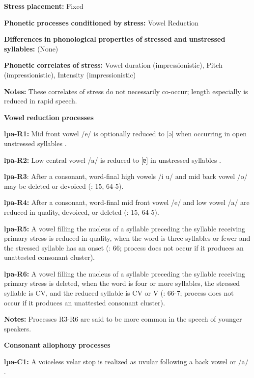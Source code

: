 \textbf{Stress} \textbf{placement:} Fixed

\textbf{Phonetic} \textbf{processes} \textbf{conditioned} \textbf{by} \textbf{stress:} Vowel Reduction

\textbf{Differences} \textbf{in} \textbf{phonological} \textbf{properties} \textbf{of} \textbf{stressed} \textbf{and} \textbf{unstressed} \textbf{syllables:} (None)

\textbf{Phonetic} \textbf{correlates} \textbf{of} \textbf{stress:} Vowel duration (impressionistic), Pitch (impressionistic), Intensity (impressionistic)

\textbf{Notes:} These correlates of stress do not necessarily co-occur; length especially is reduced in rapid speech.

\textbf{Vowel} \textbf{reduction} \textbf{processes}

\textbf{lpa-R1:} Mid front vowel /e/ is optionally reduced to [ə] when occurring in open unstressed syllables \citep[34]{Lacrampe2014}.

\textbf{lpa-R2:} Low central vowel /a/ is reduced to [ɐ] in unstressed syllables \citep[34-5]{Lacrampe2014}.

\textbf{lpa-R3}: After a consonant, word-final high vowels /i u/ and mid back vowel /o/ may be deleted or devoiced (\citealt{Lacrampe2014}: 15, 64-5).

\textbf{lpa-R4:} After a consonant, word-final mid front vowel /e/ and low vowel /a/ are reduced in quality, devoiced, or deleted (\citealt{Lacrampe2014}: 15, 64-5).

\textbf{lpa-R5:} A vowel filling the nucleus of a syllable preceding the syllable receiving primary stress is reduced in quality, when the word is three syllables or fewer and the stressed syllable has an onset (\citealt{Lacrampe2014}: 66; process does not occur if it produces an unattested consonant cluster).

\textbf{lpa-R6:} A vowel filling the nucleus of a syllable preceding the syllable receiving primary stress is deleted, when the word is four or more syllables, the stressed syllable is CV, and the reduced syllable is CV or V (\citealt{Lacrampe2014}: 66-7; process does not occur if it produces an unattested consonant cluster).

\textbf{Notes:} Processes R3-R6 are said to be more common in the speech of younger speakers.

\textbf{Consonant} \textbf{allophony} \textbf{processes}

\textbf{lpa-C1:} A voiceless velar stop is realized as uvular following a back vowel or /a/ \citep[19]{Lacrampe2014}.

